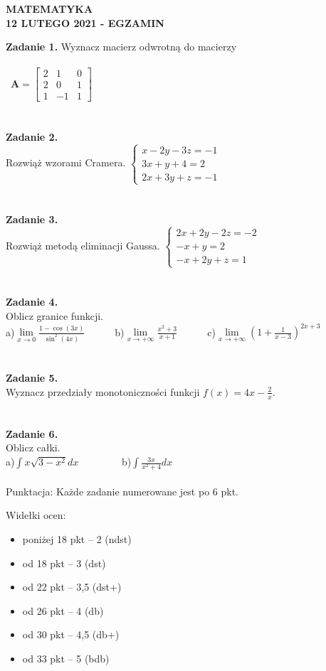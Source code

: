 \documentclass[12pt,a4paper]{report}
\begin{document}
\begin{center}

\textbf{MATEMATYKA \\12 LUTEGO 2021 - EGZAMIN}

\end{center}\textbf{Zadanie 1.} Wyznacz macierz odwrotną do macierzy \\\\\ $\mathbf{A} =\left[ \begin{array}{ccc}2 & 1& 0\\2& 0& 1\\1 & -1& 1\end{array} \right]$\\\\\\\textbf{Zadanie 2.}  \\Rozwiąż wzorami Cramera. $\left\{ \begin{array}{ll}x-2y-3z=-1\\ 3x+y+4=2\\2x+3y+z=-1\end{array}\right.$\\\\\\\textbf{Zadanie 3.} \\Rozwiąż metodą eliminacji Gaussa. $\left\{ \begin{array}{ll}2x+2y-2z=-2\\ -x+y=2\\-x+2y+z=1\end{array} \right.$\\\\\\\textbf{Zadanie 4.} \\Oblicz granice funkcji.\\a)$\lim\limits_{x\to 0}\frac{1-\cos(3x)}{\sin^2(4x)}$\ \ \ \ \ \  b)$\lim\limits_{x\to +\infty}\frac{x^2+3}{x+1}$\ \ \ \ \ \ c)$\lim\limits_{x\to +\infty}\left( 1+\frac{1}{x-3}\right)^{2x+3}$\\\\\\\textbf{Zadanie 5.} \\Wyznacz przedziały monotoniczności funkcji $f(x)=4x-\frac{2}{x}$.\\\\\\\textbf{Zadanie 6.} \\Oblicz całki. \\a)$\int x\sqrt{3-x^2} dx$ \ \ \ \ \ \ \ \ b)$\int \frac{3x}{x^2+4} dx$\\\\Punktacja: Każde zadanie numerowane jest po 6 pkt.



Widełki ocen:

\begin{itemize}

\item poniżej 18 pkt -- 2 (ndst)

\item od 18 pkt -- 3 (dst)

\item od 22 pkt -- 3,5 (dst+)

\item od 26 pkt -- 4 (db)

\item od 30 pkt -- 4,5 (db+)

\item od 33 pkt -- 5 (bdb)

\end{itemize}
\end{document}
